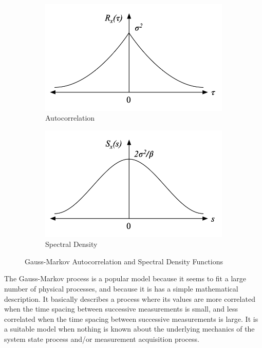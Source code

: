 \documentclass[12pt]{article}
\begin{document}
\begin{figure}[ht]
    \centering
    \begin{subfigure}{0.49\textwidth}
        \includegraphics[width=\textwidth]{GM-Autocorrelation.png}
        \caption{Autocorrelation}
    \end{subfigure}
    \begin{subfigure}{0.49\textwidth}
        \includegraphics[width=\textwidth]{GM-Spectral-Density.png}
        \caption{Spectral Density}
    \end{subfigure}
    \caption{Gauss-Markov Autocorrelation and Spectral Density Functions}
    \label{fig:GM-characteristics}
\end{figure}

The Gauss-Markov process is a popular model because it seems to fit a large number of
physical processes, and because it is has a simple mathematical description. It basically
describes a process where its values are more correlated when the time spacing between
successive measurements is small, and less correlated when the time spacing between
successive measurements is large. It is a suitable model when nothing is known about the
underlying mechanics of the system state process and/or measurement acquisition process.
\end{document}
